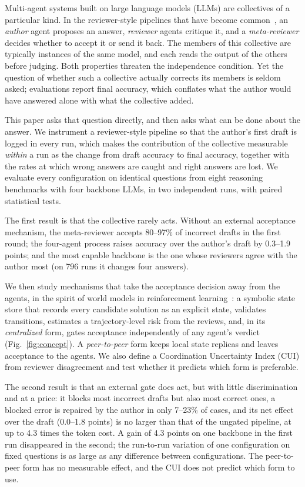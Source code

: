 \documentclass[manuscript, screen, review]{acmart}
\begin{document}
Multi-agent systems built on large language models (LLMs) are collectives of a particular kind. In the reviewer-style pipelines that have become common~\cite{du2024improving,liang2024mad,chen2024reconcile,wang2025mars}, an \emph{author} agent proposes an answer, \emph{reviewer} agents critique it, and a \emph{meta-reviewer} decides whether to accept it or send it back. The members of this collective are typically instances of the same model, and each reads the output of the others before judging. Both properties threaten the independence condition. Yet the question of whether such a collective actually corrects its members is seldom asked; evaluations report final accuracy, which conflates what the author would have answered alone with what the collective added.

This paper asks that question directly, and then asks what can be done about the answer.
We instrument a reviewer-style pipeline so that the author's first draft is logged in every run, which makes the contribution of the collective measurable \emph{within} a run as the change from draft accuracy to final accuracy, together with the rates at which wrong answers are caught and right answers are lost.
We evaluate every configuration on identical questions from eight reasoning benchmarks with four backbone LLMs, in two independent runs, with paired statistical tests.

The first result is that the collective rarely acts. Without an external acceptance mechanism, the meta-reviewer accepts 80--97\% of incorrect drafts in the first round; the four-agent process raises accuracy over the author's draft by 0.3--1.9 points; and the most capable backbone is the one whose reviewers agree with the author most (on 796 runs it changes four answers).

We then study mechanisms that take the acceptance decision away from the agents, in the spirit of world models in reinforcement learning~\cite{ha2018recurrent,hafner2020dream}: a symbolic state store that records every candidate solution as an explicit state, validates transitions, estimates a trajectory-level risk from the reviews, and, in its \emph{centralized} form, gates acceptance independently of any agent's verdict (Fig.~\ref{fig:concept}). A \emph{peer-to-peer} form keeps local state replicas and leaves acceptance to the agents. We also define a Coordination Uncertainty Index (CUI) from reviewer disagreement and test whether it predicts which form is preferable.

The second result is that an external gate does act, but with little discrimination and at a price: it blocks most incorrect drafts but also most correct ones, a blocked error is repaired by the author in only 7--23\% of cases, and its net effect over the draft (0.0--1.8 points) is no larger than that of the ungated pipeline, at up to 4.3 times the token cost. A gain of 4.3 points on one backbone in the first run disappeared in the second; the run-to-run variation of one configuration on fixed questions is as large as any difference between configurations. The peer-to-peer form has no measurable effect, and the CUI does not predict which form to use.
\end{document}

